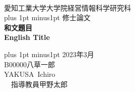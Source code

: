 \documentclass[dvipdfmx]{jreport}
\begin{document}
\begin{titlepage}
    \begin{center}

        \ \vspace{19mm}

        \LARGE\baselineskip=13mm
        愛知工業大学大学院経営情報科学研究科 \\
        \kanjiskip=12pt plus 1pt minus1pt
        修士論文 \\[1mm]

        {\Huge\baselineskip=13mm
        \textbf{和文題目} \\
        \textbf{English Title} \\
        }

        \vspace{80mm}

        \kanjiskip=9pt plus 1pt minus1pt
        2023年3月 \\
        B00000\hspace{1zw}八草一郎 \\
        YAKUSA\ Ichiro \\
        \ \hbox{\kanjiskip=0pt 指導教員}\hspace{1zw}甲野太郎\hspace{1zw}

    \end{center}
\end{titlepage}
\end{document}
